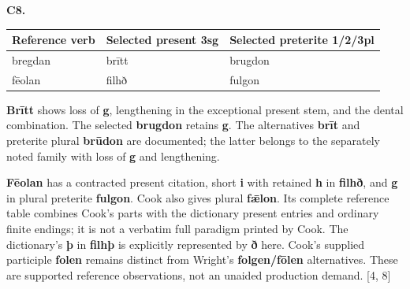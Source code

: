 \begin{minipage}{\linewidth}
\end{minipage}\par\addvspace{4pt}

\par\begin{minipage}{\linewidth}\raggedright
\textbf{C8.}

\par\begingroup
\fontsize{10.5}{13.2}\selectfont
\setlength{\LTleft}{0pt}\setlength{\LTright}{\fill}
\noindent
\begin{tabular}{@{}>{\raggedright\arraybackslash}p{32.25mm}>{\raggedright\arraybackslash}p{38.41mm}>{\raggedright\arraybackslash}p{47.72mm}@{}}
\toprule
\textbf{Reference verb} & \textbf{Selected present 3sg} & \textbf{Selected preterite 1/\allowbreak{}2/\allowbreak{}3pl} \\
\midrule
bregdan & brītt & brugdon \\
fēolan & filhð & fulgon \\
\bottomrule
\end{tabular}
\par\endgroup

\textbf{Brītt} shows loss of \textbf{g}, lengthening in the exceptional present stem, and the dental combination. The selected \textbf{brugdon} retains \textbf{g}. The alternatives \textbf{brīt} and preterite plural \textbf{brūdon} are documented; the latter belongs to the separately noted family with loss of \textbf{g} and lengthening.

\textbf{Fēolan} has a contracted present citation, short \textbf{i} with retained \textbf{h} in \textbf{filhð}, and \textbf{g} in plural preterite \textbf{fulgon}. Cook also gives plural \textbf{fǣlon}. Its complete reference table combines Cook's parts with the dictionary present entries and ordinary finite endings; it is not a verbatim full paradigm printed by Cook. The dictionary's \textbf{þ} in \textbf{filhþ} is explicitly represented by \textbf{ð} here. Cook's supplied participle \textbf{folen} remains distinct from Wright's \textbf{folgen/\allowbreak{}fōlen} alternatives. These are supported reference observations, not an unaided production demand. [4, 8]

\end{minipage}\par\addvspace{4pt}

